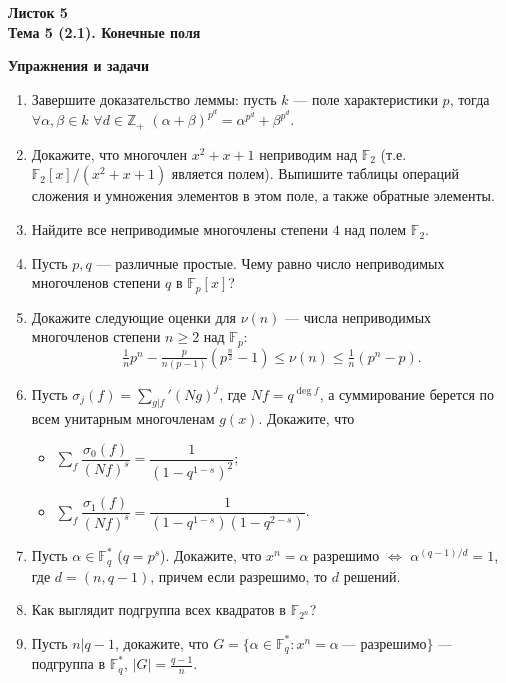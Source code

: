 \documentclass[a4paper, 11pt]{article}
\begin{document}
\begin{center} \Large \bf Листок 5\\ Тема 5 (2.1). Конечные поля \end{center}

\noindent\textbf{Упражнения и задачи}

\begin{enumerate}[topsep=0pt]
    \item Завершите доказательство леммы: пусть $k$ --- поле характеристики $p$, тогда $\forall \alpha, \beta \in k$ $\forall d \in \mathbb{Z}_+$ $(\alpha+\beta)^{p^d}=\alpha^{p^d}+\beta^{p^d}$.
    \item Докажите, что многочлен $x^2+x+1$ неприводим над $\mathbb{F}_2$ (т.е. $\mathbb{F}_2[x]/(x^2+x+1)$ является полем). Выпишите таблицы операций сложения и умножения элементов в этом поле, а также обратные элементы.
    \item Найдите все неприводимые многочлены степени $4$ над полем $\mathbb{F}_2$.
    \item Пусть $p,q$ --- различные простые. Чему равно число неприводимых многочленов степени $q$ в $\mathbb{F}_p[x]$? %
    \item Докажите следующие оценки для $\nu(n)$ --- числа неприводимых многочленов степени $n\geqslant 2$ над $\mathbb{F}_p$:
    $$
    \tfrac{1}{n} p^n - \tfrac{p}{n(p-1)}(p^{\frac{n}{2}}-1) \leqslant \nu(n) \leqslant \tfrac{1}{n}(p^n-p).
    $$
    \item Пусть $\sigma_j(f) = \sum_{g|f}' (Ng)^j$, где $Nf=q^{\deg f}$, а суммирование берется по всем унитарным многочленам $g(x)$. Докажите, что
    \begin{itemize}[noitemsep,topsep=0pt]
        \item $\sum\limits_f \dfrac{\sigma_0(f)}{(Nf)^s} = \dfrac{1}{(1-q^{1-s})^2}$;
        \item $\sum\limits_f \dfrac{\sigma_1(f)}{(Nf)^s} = \dfrac{1}{(1-q^{1-s})(1-q^{2-s})}$.
    \end{itemize} %
    \item Пусть $\alpha \in \mathbb{F}_q^*$ ($q=p^s$). Докажите, что $x^n=\alpha$ разрешимо $\Leftrightarrow$ $\alpha^{(q-1)/d}=1$, где $d=(n,q-1)$, причем если разрешимо, то $d$ решений. %
    \item Как выглядит подгруппа всех квадратов в $\mathbb{F}_{2^n}$? %
    \item Пусть $n|q-1$, докажите, что $G=\{\alpha\in\mathbb{F}_q^*: x^n=\alpha\ \text{--- разрешимо}\}$ --- подгруппа в $\mathbb{F}_q^*$, $|G|=\frac{q-1}{n}$. %

\end{enumerate}
\end{document}

